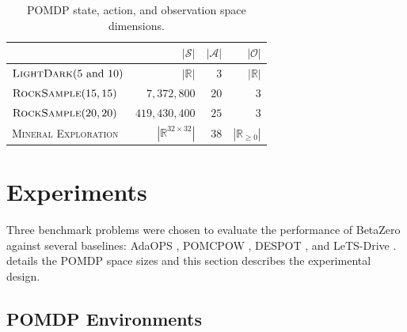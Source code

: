 \begin{table}[b!]
    \centering
    \begin{threeparttable}
        \begin{tabular}{@{}lrrr@{}}
            \toprule
                                                   &  $|\mathcal{S}|$              &  $|\mathcal{A}|$  &  $|\mathcal{O}|$  \\
            \midrule
            $\textsc{LightDark}(5 \text{ and } 10)$  &  $|\mathbb{R}|$               &  $3$              &  $|\mathbb{R}|$  \\
            $\textsc{RockSample}(15,15)$             &  $7{,}372{,}800$              &  $20$             &  $3$  \\
            $\textsc{RockSample}(20,20)$             &  $419{,}430{,}400$            &  $25$             &  $3$  \\
            \textsc{Mineral Exploration}             &  $|\mathbb{R}^{32\times32}|$  &  $38$             &  $|\mathbb{R}_{\ge 0}|$  \\
            \bottomrule
        \end{tabular}
    \end{threeparttable}
    \caption{POMDP state, action, and observation space dimensions.}\label{tab:spaces}
    \vspace*{-3mm}
\end{table}

\section{Experiments}\label{sec:betazero_experiments}

Three benchmark problems were chosen to evaluate the performance of BetaZero against several baselines: AdaOPS \cite{wu2021adaptive}, POMCPOW \cite{sunberg2018online}, DESPOT \cite{ye2017despot}, and LeTS-Drive \cite{cai2022closing}.
 details the POMDP space sizes and this section describes the experimental design.

\subsection{POMDP Environments}

